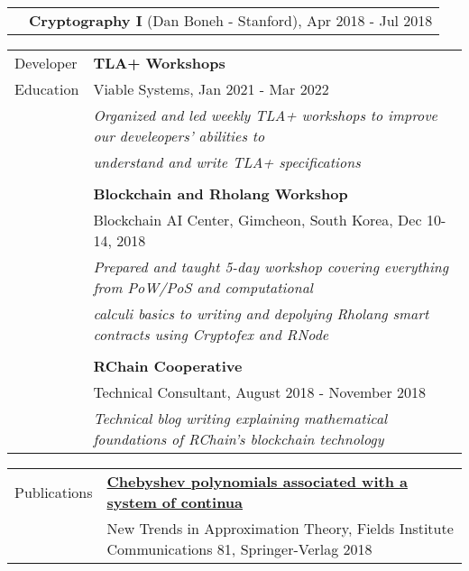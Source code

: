 \documentclass[letterpaper,10pt,oneside]{article}
\begin{document}
\begin{tabular}{@{} l l}
 & \textbf{Cryptography I} (Dan Boneh - Stanford), Apr 2018 - Jul 2018 \\
\end{tabular}

\vfill


\noindent \begin{tabular}{@{} l l}
 \Large{Developer} & \textbf{TLA+ Workshops} \\
 \Large{Education} & Viable Systems, Jan 2021 - Mar 2022 \\
 \hspace{1.1in} & \emph{Organized and led weekly TLA+ workshops to improve our develeopers' abilities to} \\
 & \emph{understand and write TLA+ specifications} \\
 & \\
 & \textbf{Blockchain and Rholang Workshop} \\
 & Blockchain AI Center, Gimcheon, South Korea, Dec 10-14, 2018 \\
 & \emph{Prepared and taught 5-day workshop covering everything from PoW/PoS and computational} \\
 & \emph{calculi basics to writing and depolying Rholang smart contracts using Cryptofex and RNode} \\
 & \\
 &  \textbf{RChain Cooperative} \\
 & Technical Consultant, August 2018 - November 2018 \\
 & \emph{Technical blog writing explaining mathematical foundations of RChain's blockchain technology} \\
\end{tabular}

\vfill


\noindent \begin{tabular}{@{} l l}
 \Large{Publications} & \href{https://link.springer.com/chapter/10.1007/978-1-4939-7543-3_7}{\textbf{Chebyshev polynomials associated with a system of continua}} \\
 \hspace{1.1in} & New Trends in Approximation Theory, Fields Institute Communications 81, Springer-Verlag 2018 \\
\end{tabular}
\end{document}
